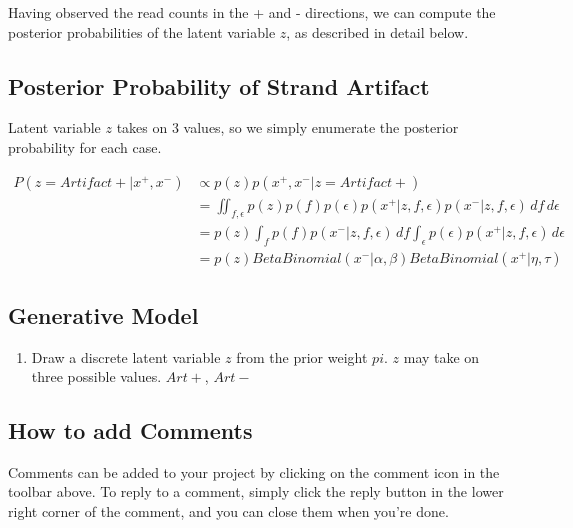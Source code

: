 \documentclass[a4paper]{article}
\begin{document}
Having observed the read counts in the + and - directions, we can compute the posterior probabilities of the latent variable $z$, as described in detail below.

\subsection{Posterior Probability of Strand Artifact}

Latent variable $z$ takes on 3 values, so we simply enumerate the posterior probability for each case.

\begin{equation}
\begin{split}
P(z=Artifact+ |x^+, x^-) & \propto p(z) p(x^+, x^- | z=Artifact+) \\
                     & = \iint_{f, \epsilon} p(z) p(f) p(\epsilon) p(x^+ | z, f, \epsilon) p(x^- | z, f, \epsilon) \,df\,d\epsilon \\
                     & = p(z) \int_f p(f) p(x^- | z, f, \epsilon) \, df \int_\epsilon p(\epsilon) p(x^+ | z, f, \epsilon) \, d\epsilon \\
                     & = p(z) BetaBinomial(x^-| \alpha, \beta) BetaBinomial(x^+| \eta, \tau) 
\end{split}
\end{equation}

\subsection{Generative Model}

\begin{enumerate}
\item Draw a discrete latent variable $z$ from the prior weight $pi$. $z$ may take on three possible values. $Art+$, $Art-$
\end{enumerate}





\subsection{How to add Comments}

Comments can be added to your project by clicking on the comment icon in the toolbar above. %
%
%
To reply to a comment, simply click the reply button in the lower right corner of the comment, and you can close them when you're done.
\end{document}
